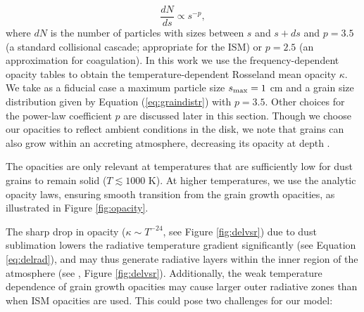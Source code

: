 \begin{equation}
\label{eq:graindistr}
\frac{dN}{ds} \propto s^{-p},
\end{equation}
where $dN$ is the number of particles with sizes between $s$ and $s + ds$ and $p=3.5$ (a standard \citealt{dohnanyi69} collisional cascade; appropriate for the ISM) or $p=2.5$ (an approximation for coagulation). In this work we use the  \citet{dalessio01} frequency-dependent opacity tables to obtain the temperature-dependent Rosseland mean opacity $\kappa$. We take as a fiducial case a maximum particle size $s_{\rm max}=1$ cm and a grain size distribution given by Equation (\ref{eq:graindistr}) with $p=3.5$. Other choices for the power-law coefficient $p$ are discussed later in this section. 
Though we choose our opacities to reflect ambient conditions in the disk, we note that 
grains can also grow within an accreting atmosphere, decreasing its opacity at depth \citep{movshovitz10,mordasini14b,ormel14}.


The \citet{dalessio01} opacities are only relevant at temperatures that are sufficiently low for dust grains to remain solid ($T \lesssim 1000$ K). At higher temperatures, we use the \citet{bell94} analytic opacity laws, ensuring smooth transition from the grain growth opacities, as illustrated in Figure \ref{fig:opacity}. 

The sharp drop in opacity ($\kappa \sim T^{-24}$, see Figure \ref{fig:delvsr}) due to dust sublimation lowers the radiative temperature gradient significantly (see Equation \ref{eq:delrad}), and may thus generate radiative layers within the inner region of the atmosphere (see , Figure \ref{fig:delvsr}). Additionally, the weak temperature dependence of grain growth opacities may cause larger outer radiative zones than when ISM opacities are used. This could pose two challenges for our model:

